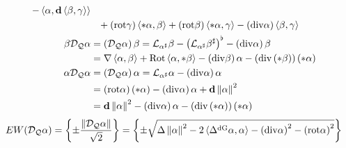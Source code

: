 \documentclass[a4paper,7pt]{scrartcl}
\newcommand{\exd}{\mathbf{d}}
\newcommand{\rot}{\mathrm{rot}}
\renewcommand{\div}{\mathrm{div}}
\newcommand{\Rot}{\mathrm{Rot}}
\newcommand{\lie}{\mathcal{L}}
\newcommand{\dq}{\mathcal{D}_{\mathcal{Q}}}
\newcommand{\laplace}[1]{\Delta^{#1}}
\newcommand{\ldivgrad}{\laplace{\textup{dG}}}
\begin{document}
\begin{align*}
             -\left\langle \alpha,\exd\left\langle \beta,\gamma \right\rangle \right\rangle  \\
          &\hphantom{=}   +(\rot\gamma)\left\langle *\alpha,\beta \right\rangle
             +(\rot\beta)\left\langle *\alpha,\gamma \right\rangle
             -(\div\alpha)\left\langle \beta, \gamma \right\rangle\\
    \beta\dq\alpha &= \left( \dq\alpha \right)\beta = \lie_{\alpha^{\sharp}}\beta - \left( \lie_{\alpha^{\sharp}}\beta^{\sharp} \right)^{\flat} - \left( \div\alpha \right)\beta\\
                   &= \nabla\left\langle \alpha, \beta \right\rangle + \Rot\left\langle \alpha , *\beta \right\rangle
                        - \left( \div\beta \right)\alpha - \left(\div\left(*\beta\right)\right)\left(*\alpha\right) \\
    \alpha\dq\alpha &= \left( \dq\alpha \right)\alpha = \lie_{\alpha^{\sharp}}\alpha - \left( \div\alpha \right)\alpha\\
                    &= \left( \rot\alpha \right)\left( *\alpha \right) - \left( \div\alpha \right)\alpha +\exd\left\| \alpha \right\|^{2}\\
                    &= \exd\left\| \alpha \right\|^{2} -  \left( \div\alpha \right)\alpha -  \left( \div\left( *\alpha \right)\right)\left( *\alpha \right)
  \end{align*}
  \begin{align*}
    EW(\dq\alpha) &= \left\{ \pm \frac{\left\| \dq\alpha \right\|}{\sqrt{2}} \right\}
           =\left\{ \pm \sqrt{\Delta\left\| \alpha \right\|^{2} - 2\left\langle \ldivgrad\alpha , \alpha \right\rangle 
                                  -\left( \div\alpha \right)^{2} - \left( \rot\alpha \right)^{2}} \right\}
  \end{align*}
\end{document}

